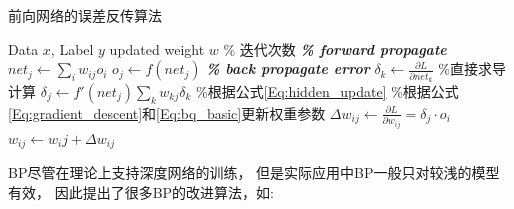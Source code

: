 \renewcommand{\algorithmicrequire}{ \textbf{Input:}}      %
\renewcommand{\algorithmicensure}{ \textbf{Output:}}     %
\begin{algorithm}
\caption{前向网络的误差反传算法}
\label{algo:BP_basic}
\begin{algorithmic}[1]  
\Require Data $x$, Label $y$
\Ensure  updated weight $w$
 \% 迭代次数
	\State \textbf{\textit{\% forward propagate}}
	\State $net_j \leftarrow \sum_i w_{ij}o_i$
	\State $o_j \leftarrow f(net_j)$
	\EndFor
	\State 
	\State \textbf{\textit{\% back propagate error}}
		\State $\delta_k \leftarrow \frac{\partial L}{\partial net_k}$	\%直接求导计算	
	\EndFor	
		\State $\delta_j \leftarrow f'(net_j)\sum_k{w_{kj}\delta_k}$ \%根据公式\ref{Eq:hidden_update}
	\EndFor	
	 \%根据公式\ref{Eq:gradient_descent}和\ref{Eq:bq_basic}更新权重参数
		\State $\Delta w_{ij} \leftarrow \frac{\partial L}{\partial w_{ij}} = \delta_{j}\cdot o_i$
		\State $w_{ij} \leftarrow w_ij + \Delta w_{ij}$
	\EndFor
\EndFor
\end{algorithmic} 
\end{algorithm}


BP尽管在理论上支持深度网络的训练， 但是实际应用中BP一般只对较浅的模型有效\cite{schmidhuber2015deep}， 因此提出了很多BP的改进算法，如:

